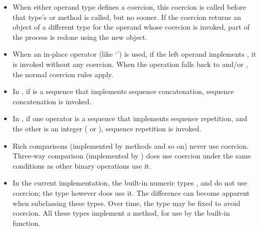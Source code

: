 \begin{itemize}
\item

When either operand type defines a coercion, this coercion is called
before that type's  or  method is
called, but no sooner.  If the coercion returns an object of a
different type for the operand whose coercion is invoked, part of the
process is redone using the new object.

\item

When an in-place operator (like `\code{+=}') is used, if the left
operand implements , it is invoked without any
coercion.  When the operation falls back to  and/or
, the normal coercion rules apply.

\item

In \code{+}, if  is a sequence that implements
sequence concatenation, sequence concatenation is invoked.

\item

In \code{*}, if one operator is a sequence that
implements sequence repetition, and the other is an integer
( or ), sequence repetition is invoked.

\item

Rich comparisons (implemented by methods  and so on)
never use coercion.  Three-way comparison (implemented by
) does use coercion under the same conditions as
other binary operations use it.

\item

In the current implementation, the built-in numeric types ,
 and  do not use coercion; the type
 however does use it.  The difference can become
apparent when subclassing these types.  Over time, the type
 may be fixed to avoid coercion.  All these types
implement a  method, for use by the built-in
 function.

\end{itemize}

